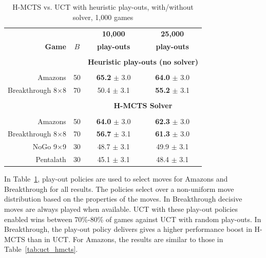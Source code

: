\documentclass[a4paper]{llncs}
\begin{document}
\begin{table}[ht]
\centering
\tabcolsep=0.3cm
\begin{tabular}{rlcc}
\hline
\multicolumn{2}{c|}{} & \multicolumn{1}{c}{\textbf{10,000}} & \multicolumn{1}{c}{\textbf{25,000}} \\ 
\textbf{Game} & \multicolumn{1}{c|}{\textbf{$B$}} & \multicolumn{1}{c}{\textbf{play-outs}} & \multicolumn{1}{c}{\textbf{play-outs}} \\ [1mm] 
\cline{1-4}
\multicolumn{2}{c|}{} \\ [-3mm]
\multicolumn{2}{c|}{} & \multicolumn{2}{c}{\textbf{Heuristic play-outs (no solver)}} \\ [1mm]
\multicolumn{2}{c|}{} \\ [-4mm]
Amazons &\multicolumn{1}{l|}{50}			    	& {\bf{65.2}} $\pm$ 3.0 		& {\bf{64.0}} $\pm$ 3.0 		\\ [.5mm] 
Breakthrough 8$\times$8 &\multicolumn{1}{l|}{70}	& 50.4 $\pm$ 3.1				& {\bf{55.2}} $\pm$ 3.1 	\\ [.5mm]
\multicolumn{2}{c|}{} \\ [-3mm]
\multicolumn{2}{c|}{} & \multicolumn{2}{c}{\textbf{H-MCTS Solver}} \\ [1mm]
\cline{1-4}
\multicolumn{2}{c|}{} \\ [-4mm]
Amazons &\multicolumn{1}{l|}{50}			    	& {\bf{64.0}} $\pm$ 3.0 	& {\bf{62.3}} $\pm$ 3.0 	\\ [.5mm] 
Breakthrough 8$\times$8 &\multicolumn{1}{l|}{70}	& {\bf{56.7}} $\pm$ 3.1		& {\bf{61.3}} $\pm$ 3.0 	\\ [.5mm]
NoGo 9$\times$9 &\multicolumn{1}{l|}{30} 			& 48.7 $\pm$ 3.1			& 49.9 $\pm$ 3.1 	\\ [.5mm] 
Pentalath &\multicolumn{1}{l|}{30} 		  			& 45.1 $\pm$ 3.1			& 48.4 $\pm$ 3.1 	\\ [.5mm] 
\hline
\end{tabular}
\vspace{4mm}
{\caption{H-MCTS vs. UCT with heuristic play-outs, with/without solver, 1,000 games} \label{tab:uct_hmcts-s-h}}
\end{table}

In Table~\ref{tab:uct_hmcts-s-h}, play-out policies are used to select moves for Amazons and Breakthrough for all results. The policies select over a non-uniform move distribution based on the properties of the moves. In Breakthrough decisive moves are always played when available. UCT with these play-out policies enabled wins between 70\%-80\% of games against UCT with random play-outs. In Breakthrough, the play-out policy delivers gives a higher performance boost in H-MCTS than in UCT. For Amazons, the results are similar to those in Table~\ref{tab:uct_hmcts}.
\end{document}
